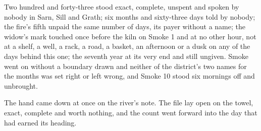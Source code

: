 Two hundred and forty-three stood exact, complete, unspent and spoken by nobody in Sarn, Sill and Grath; six months and sixty-three days told by nobody; the fire's fifth unpaid the same number of days, its payer without a name; the widow's mark touched once before the kiln on Smoke 1 and at no other hour, not at a shelf, a well, a rack, a road, a basket, an afternoon or a dusk on any of the days behind this one; the seventh year at its very end and still ungiven. Smoke went on without a boundary drawn and neither of the district's two names for the months was set right or left wrong, and Smoke 10 stood six mornings off and unbrought.

The hand came down at once on the river's note. The file lay open on the towel, exact, complete and worth nothing, and the count went forward into the day that had earned its heading.
